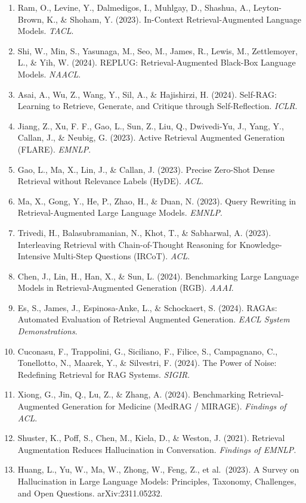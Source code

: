 \begin{enumerate}
\item
  Ram, O., Levine, Y., Dalmedigos, I., Muhlgay, D., Shashua, A., Leyton-Brown, K., \& Shoham, Y. (2023). In-Context Retrieval-Augmented Language Models. \emph{TACL}.
\item
  Shi, W., Min, S., Yasunaga, M., Seo, M., James, R., Lewis, M., Zettlemoyer, L., \& Yih, W. (2024). REPLUG: Retrieval-Augmented Black-Box Language Models. \emph{NAACL}.
\item
  Asai, A., Wu, Z., Wang, Y., Sil, A., \& Hajishirzi, H. (2024). Self-RAG: Learning to Retrieve, Generate, and Critique through Self-Reflection. \emph{ICLR}.
\item
  Jiang, Z., Xu, F. F., Gao, L., Sun, Z., Liu, Q., Dwivedi-Yu, J., Yang, Y., Callan, J., \& Neubig, G. (2023). Active Retrieval Augmented Generation (FLARE). \emph{EMNLP}.
\item
  Gao, L., Ma, X., Lin, J., \& Callan, J. (2023). Precise Zero-Shot Dense Retrieval without Relevance Labels (HyDE). \emph{ACL}.
\item
  Ma, X., Gong, Y., He, P., Zhao, H., \& Duan, N. (2023). Query Rewriting in Retrieval-Augmented Large Language Models. \emph{EMNLP}.
\item
  Trivedi, H., Balasubramanian, N., Khot, T., \& Sabharwal, A. (2023). Interleaving Retrieval with Chain-of-Thought Reasoning for Knowledge-Intensive Multi-Step Questions (IRCoT). \emph{ACL}.
\item
  Chen, J., Lin, H., Han, X., \& Sun, L. (2024). Benchmarking Large Language Models in Retrieval-Augmented Generation (RGB). \emph{AAAI}.
\item
  Es, S., James, J., Espinosa-Anke, L., \& Schockaert, S. (2024). RAGAs: Automated Evaluation of Retrieval Augmented Generation. \emph{EACL System Demonstrations}.
\item
  Cuconasu, F., Trappolini, G., Siciliano, F., Filice, S., Campagnano, C., Tonellotto, N., Maarek, Y., \& Silvestri, F. (2024). The Power of Noise: Redefining Retrieval for RAG Systems. \emph{SIGIR}.
\item
  Xiong, G., Jin, Q., Lu, Z., \& Zhang, A. (2024). Benchmarking Retrieval-Augmented Generation for Medicine (MedRAG / MIRAGE). \emph{Findings of ACL}.
\item
  Shuster, K., Poff, S., Chen, M., Kiela, D., \& Weston, J. (2021). Retrieval Augmentation Reduces Hallucination in Conversation. \emph{Findings of EMNLP}.
\item
  Huang, L., Yu, W., Ma, W., Zhong, W., Feng, Z., et al.~(2023). A Survey on Hallucination in Large Language Models: Principles, Taxonomy, Challenges, and Open Questions. arXiv:2311.05232.

\end{enumerate}
